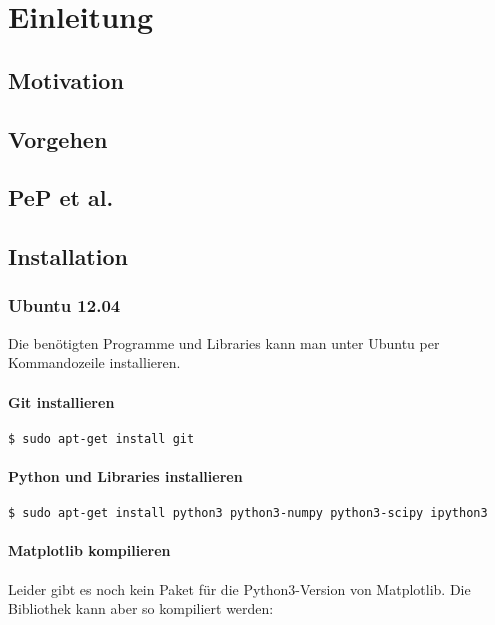


\mytitle{\today}
\newpage
\tableofcontents

\chapter{Einleitung}
\section{Motivation}
\section{Vorgehen}
\section{PeP et al.}

\section{Installation}

\subsection{Ubuntu 12.04}
Die benötigten Programme und Libraries kann man unter Ubuntu per Kommandozeile installieren.

\subsubsection{Git installieren}
\begin{verbatim}
$ sudo apt-get install git
\end{verbatim}

\subsubsection{Python und Libraries installieren}
\begin{verbatim}
$ sudo apt-get install python3 python3-numpy python3-scipy ipython3
\end{verbatim}

\subsubsection{Matplotlib kompilieren}

Leider gibt es noch kein Paket für die Python3-Version von Matplotlib.
Die Bibliothek kann aber so kompiliert werden:

